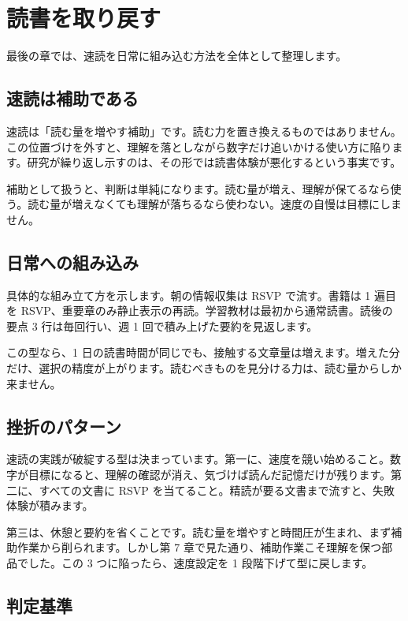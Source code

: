 \documentclass{article}
\begin{document}
\section{読書を取り戻す}

最後の章では、速読を日常に組み込む方法を全体として整理します。

\subsection{速読は補助である}

速読は「読む量を増やす補助」です。読む力を置き換えるものではありません。この位置づけを外すと、理解を落としながら数字だけ追いかける使い方に陥ります。研究が繰り返し示すのは、その形では読書体験が悪化するという事実です。

補助として扱うと、判断は単純になります。読む量が増え、理解が保てるなら使う。読む量が増えなくても理解が落ちるなら使わない。速度の自慢は目標にしません。

\subsection{日常への組み込み}

具体的な組み立て方を示します。朝の情報収集は RSVP で流す。書籍は 1 遍目を RSVP、重要章のみ静止表示の再読。学習教材は最初から通常読書。読後の要点 3 行は毎回行い、週 1 回で積み上げた要約を見返します。

この型なら、1 日の読書時間が同じでも、接触する文章量は増えます。増えた分だけ、選択の精度が上がります。読むべきものを見分ける力は、読む量からしか来ません。

\subsection{挫折のパターン}

速読の実践が破綻する型は決まっています。第一に、速度を競い始めること。数字が目標になると、理解の確認が消え、気づけば読んだ記憶だけが残ります。第二に、すべての文書に RSVP を当てること。精読が要る文書まで流すと、失敗体験が積みます。

第三は、休憩と要約を省くことです。読む量を増やすと時間圧が生まれ、まず補助作業から削られます。しかし第 7 章で見た通り、補助作業こそ理解を保つ部品でした。この 3 つに陥ったら、速度設定を 1 段階下げて型に戻します。

\subsection{判定基準}
\end{document}
